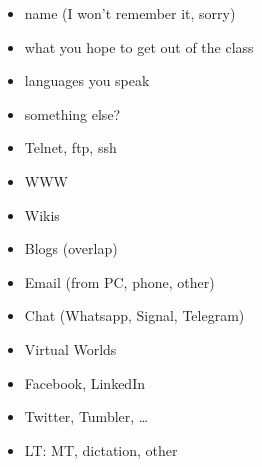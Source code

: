 \documentclass[a4paper,landscape,headrule,footrule,xetex]{foils}
\begin{document}












\begin{itemize}
\item name  (I won't remember it, sorry)
\item what you hope to get out of the class
\item languages you speak
\item something else?
\end{itemize}


\begin{itemize} \addtolength{\itemsep}{-0.5ex}
\item Telnet, ftp, ssh
\item WWW
\item Wikis
\item Blogs (overlap)
\item Email (from PC, phone, other)
\item Chat (Whatsapp, Signal, Telegram)
\item Virtual Worlds
\item Facebook, LinkedIn
\item Twitter, Tumbler, \ldots
\item LT: MT, dictation, other
\end{itemize}


\end{document}
